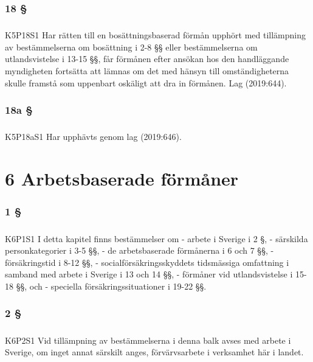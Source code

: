 \documentclass[a4paper,notitlepage,openany,10pt]{book}
\begin{document}
\subsection*{18 §}
\paragraph*{}
{\tiny K5P18S1}
Har rätten till en bosättningsbaserad förmån upphört med tillämpning av bestämmelserna om bosättning i 2-8 §§ eller bestämmelserna om utlandsvistelse i 13-15 §§, får förmånen efter ansökan hos den handläggande myndigheten fortsätta att lämnas om det med hänsyn till omständigheterna skulle framstå som uppenbart oskäligt att dra in förmånen.
Lag (2019:644).
\subsection*{18a §}
\paragraph*{}
{\tiny K5P18aS1}
Har upphävts genom
lag (2019:646).
\chapter*{6 Arbetsbaserade förmåner}
\subsection*{1 §}
\paragraph*{}
{\tiny K6P1S1}
I detta kapitel finns bestämmelser om
\newline - arbete i Sverige i 2 §,
\newline - särskilda personkategorier i 3-5 §§,
\newline - de arbetsbaserade förmånerna i 6 och 7 §§,
\newline - försäkringstid i 8-12 §§,
\newline - socialförsäkringsskyddets tidsmässiga omfattning i samband med arbete i Sverige i 13 och 14 §§,
\newline - förmåner vid utlandsvistelse i 15-18 §§, och
\newline - speciella försäkringssituationer i 19-22 §§.
\subsection*{2 §}
\paragraph*{}
{\tiny K6P2S1}
Vid tillämpning av bestämmelserna i denna balk avses med arbete i Sverige, om inget annat särskilt anges, förvärvsarbete i verksamhet här i landet.
\end{document}
